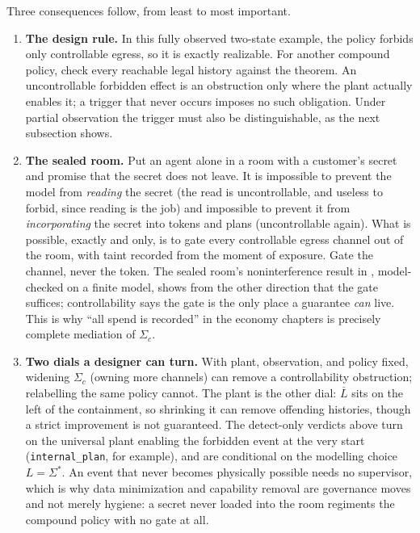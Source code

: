 \documentclass[11pt,a4paper]{article}
\theoremstyle{definition}
\theoremstyle{remark}
\begin{document}
Three consequences follow, from least to most important.
\begin{enumerate}[leftmargin=1.6em,itemsep=2pt]
\item \textbf{The design rule.} In this fully observed two-state example,
  the policy forbids only controllable egress, so it is exactly realizable.
  For another compound policy, check every reachable legal history against
  the theorem. An uncontrollable forbidden effect is an obstruction only
  where the plant actually enables it; a trigger that never occurs imposes
  no such obligation. Under partial observation the trigger must also be
  distinguishable, as the next subsection shows.
\item \textbf{The sealed room.} Put an agent alone in a room with a customer's secret and
  promise that the secret does not leave. It is impossible to prevent the model from
  \emph{reading} the secret (the read is uncontrollable, and useless to forbid, since reading is
  the job) and impossible to prevent it from \emph{incorporating} the secret into tokens and
  plans (uncontrollable again). What is possible, exactly and only, is to gate every
  controllable egress channel out of the room, with taint recorded from the moment of
  exposure. Gate the channel, never the token. The sealed room's noninterference result in
  , model-checked on a finite model, shows from the
  other direction that the gate suffices; controllability says the
  gate is the only place a guarantee \emph{can} live. This is why ``all spend is recorded'' in
  the economy chapters is precisely complete mediation of $\Sigma_c$.
\item \textbf{Two dials a designer can turn.} With plant, observation, and policy fixed, widening $\Sigma_c$
  (owning more channels) can remove a controllability obstruction; relabelling
  the same policy cannot.
  The plant is the other dial: $\overline{L}$ sits on the left of the containment, so shrinking
  it can remove offending histories, though a strict improvement is not guaranteed. The detect-only verdicts above
  turn on the universal plant enabling the forbidden event at the very start (\texttt{internal\_plan},
  for example), and are conditional on the modelling choice $L = \Sigma^{*}$. An event that never becomes physically possible needs no
  supervisor, which is why data minimization and capability removal are governance moves and
  not merely hygiene: a secret never loaded into the room regiments the compound policy with
  no gate at all.
\end{enumerate}
\end{document}
